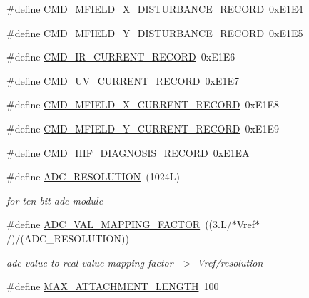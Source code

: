 \begin{DoxyCompactItemize}
\item 
\#define \hyperlink{a00031_ab84aea346a3f75b58f8bda67b8ae9be0}{C\+M\+D\+\_\+\+M\+F\+I\+E\+L\+D\+\_\+\+X\+\_\+\+D\+I\+S\+T\+U\+R\+B\+A\+N\+C\+E\+\_\+\+R\+E\+C\+O\+R\+D}~0x\+E1\+E4
\item 
\#define \hyperlink{a00031_af77e9c0ad32b3cc50d61992d4b64a831}{C\+M\+D\+\_\+\+M\+F\+I\+E\+L\+D\+\_\+\+Y\+\_\+\+D\+I\+S\+T\+U\+R\+B\+A\+N\+C\+E\+\_\+\+R\+E\+C\+O\+R\+D}~0x\+E1\+E5
\item 
\#define \hyperlink{a00031_a4dcce4fd3ff29eb6782f3228901f99cf}{C\+M\+D\+\_\+\+I\+R\+\_\+\+C\+U\+R\+R\+E\+N\+T\+\_\+\+R\+E\+C\+O\+R\+D}~0x\+E1\+E6
\item 
\#define \hyperlink{a00031_ab0e0364ddc2d95d1e5b51a3e3ff50918}{C\+M\+D\+\_\+\+U\+V\+\_\+\+C\+U\+R\+R\+E\+N\+T\+\_\+\+R\+E\+C\+O\+R\+D}~0x\+E1\+E7
\item 
\#define \hyperlink{a00031_ab796345ffdbc6a240b67b56583bb77c6}{C\+M\+D\+\_\+\+M\+F\+I\+E\+L\+D\+\_\+\+X\+\_\+\+C\+U\+R\+R\+E\+N\+T\+\_\+\+R\+E\+C\+O\+R\+D}~0x\+E1\+E8
\item 
\#define \hyperlink{a00031_a8ddac7f7a2a90f2d8535af02e338b1bf}{C\+M\+D\+\_\+\+M\+F\+I\+E\+L\+D\+\_\+\+Y\+\_\+\+C\+U\+R\+R\+E\+N\+T\+\_\+\+R\+E\+C\+O\+R\+D}~0x\+E1\+E9
\item 
\#define \hyperlink{a00031_a185ed5442d69c7c8abba13323a8e8187}{C\+M\+D\+\_\+\+H\+I\+F\+\_\+\+D\+I\+A\+G\+N\+O\+S\+I\+S\+\_\+\+R\+E\+C\+O\+R\+D}~0x\+E1\+E\+A
\item 
\#define \hyperlink{a00031_a00978ca9e8220475258dcbbbb7d29129}{A\+D\+C\+\_\+\+R\+E\+S\+O\+L\+U\+T\+I\+O\+N}~(1024\+L)
\begin{DoxyCompactList}\small\item\em for ten bit adc module \end{DoxyCompactList}\item 
\#define \hyperlink{a00031_ada92d3eeeec0cbeee41e76a52d145792}{A\+D\+C\+\_\+\+V\+A\+L\+\_\+\+M\+A\+P\+P\+I\+N\+G\+\_\+\+F\+A\+C\+T\+O\+R}~((3.\+L/$\ast$\+Vref$\ast$/)/(\+A\+D\+C\+\_\+\+R\+E\+S\+O\+L\+U\+T\+I\+O\+N))
\begin{DoxyCompactList}\small\item\em adc value to real value mapping factor -\/$>$ Vref/resolution \end{DoxyCompactList}\item 
\#define \hyperlink{a00031_aa8abe3a822c64813f7aaba3ca7e3db9c}{M\+A\+X\+\_\+\+A\+T\+T\+A\+C\+H\+M\+E\+N\+T\+\_\+\+L\+E\+N\+G\+T\+H}~100
\end{DoxyCompactItemize}


